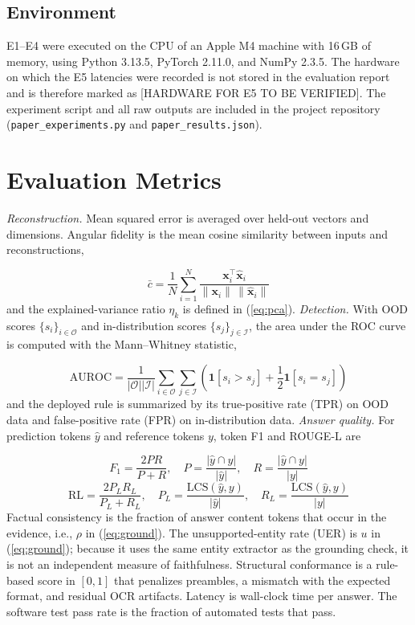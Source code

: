 \documentclass[conference]{IEEEtran}
\begin{document}
\subsection{Environment}
E1--E4 were executed on the CPU of an Apple M4 machine with 16\,GB of memory, using Python 3.13.5, PyTorch 2.11.0, and NumPy 2.3.5. The hardware on which the E5 latencies were recorded is not stored in the evaluation report and is therefore marked as [HARDWARE FOR E5 TO BE VERIFIED]. The experiment script and all raw outputs are included in the project repository (\texttt{paper\_experiments.py} and \texttt{paper\_results.json}).

\section{Evaluation Metrics}
\emph{Reconstruction.} Mean squared error is averaged over held-out vectors and dimensions. Angular fidelity is the mean cosine similarity between inputs and reconstructions,

\begin{equation}
\bar{c}=\frac{1}{N}\sum_{i=1}^{N}\frac{\mathbf{x}_i^{\top}\hat{\mathbf{x}}_i}{\|\mathbf{x}_i\|\,\|\hat{\mathbf{x}}_i\|}
\label{eq:cos}
\end{equation}
and the explained-variance ratio $\eta_k$ is defined in (\ref{eq:pca}). \emph{Detection.} With OOD scores $\{s_i\}_{i\in\mathcal{O}}$ and in-distribution scores $\{s_j\}_{j\in\mathcal{I}}$, the area under the ROC curve \cite{fawcett2006} is computed with the Mann--Whitney statistic,

\begin{equation}
\mathrm{AUROC}=\frac{1}{|\mathcal{O}||\mathcal{I}|}\sum_{i\in\mathcal{O}}\sum_{j\in\mathcal{I}}\left(\mathbf{1}[s_i>s_j]+\frac{1}{2}\mathbf{1}[s_i=s_j]\right)
\label{eq:auroc}
\end{equation}
and the deployed rule is summarized by its true-positive rate (TPR) on OOD data and false-positive rate (FPR) on in-distribution data. \emph{Answer quality.} For prediction tokens $\hat{y}$ and reference tokens $y$, token F1 \cite{rajpurkar2016} and ROUGE-L \cite{lin2004} are

\begin{equation}
F_1=\frac{2PR}{P+R},\quad P=\frac{|\hat{y}\cap y|}{|\hat{y}|},\quad R=\frac{|\hat{y}\cap y|}{|y|}
\label{eq:f1}
\end{equation}
\begin{equation}
\mathrm{RL}=\frac{2P_LR_L}{P_L+R_L},\quad P_L=\frac{\mathrm{LCS}(\hat{y},y)}{|\hat{y}|},\quad R_L=\frac{\mathrm{LCS}(\hat{y},y)}{|y|}
\label{eq:rouge}
\end{equation}
Factual consistency is the fraction of answer content tokens that occur in the evidence, i.e., $\rho$ in (\ref{eq:ground}). The unsupported-entity rate (UER) is $u$ in (\ref{eq:ground}); because it uses the same entity extractor as the grounding check, it is not an independent measure of faithfulness. Structural conformance is a rule-based score in $[0,1]$ that penalizes preambles, a mismatch with the expected format, and residual OCR artifacts. Latency is wall-clock time per answer. The software test pass rate is the fraction of automated tests that pass.
\end{document}
